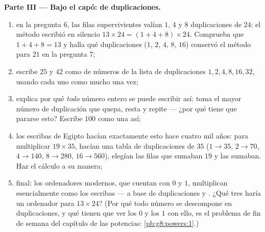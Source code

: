 \begin{problem}
\medskip
\noindent\textbf{Parte III --- Bajo el capó:  de
duplicaciones.}
\begin{enumerate}[resume]
  \item en la pregunta 6, las filas supervivientes valían $1$, $4$
        y $8$ duplicaciones de $24$: el método escribió en silencio
        $13 \times 24 = (1 + 4 + 8) \times 24$. Comprueba que
        $1 + 4 + 8 = 13$ y halla qué duplicaciones ($1$, $2$,
        $4$, $8$, $16$) conservó el método para $21$ en la pregunta 7;
  \item escribe $25$ y $42$ como  de números de la lista de
        duplicaciones $1, 2, 4, 8, 16, 32$, usando cada uno como mucho una vez;
  \item explica por qué \emph{todo} número entero se puede escribir
        así: toma el mayor número de duplicación que quepa,
        resta y repite --- ¿por qué tiene que pararse esto? Escribe $100$ como
        una  así;
  \item los escribas de Egipto hacían exactamente esto hace cuatro mil
        años: para multiplicar $19 \times 35$, hacían una
        tabla de duplicaciones de $35$ ($1 \to 35$, $2 \to 70$,
        $4 \to 140$, $8 \to 280$, $16 \to 560$), elegían las filas
        que sumaban $19$ y las sumaban. Haz el cálculo a su
        manera;
  \item final: los ordenadores modernos, que cuentan con $0$ y
        $1$, multiplican esencialmente como los escribas --- a base de
        duplicaciones y . ¿Qué tres  haría un
        ordenador para $13 \times 24$? (Por qué todo número
        se descompone en duplicaciones, y qué tienen que ver los $0$ y los $1$
        con ello, es el problema de fin de semana del capítulo de las potencias:
        \cref{pb:g8:powers:1}.)
\end{enumerate}
\end{problem}
